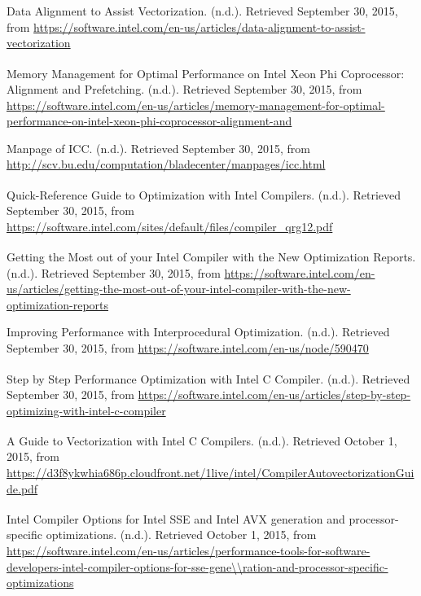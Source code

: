 \documentclass[11pt]{article}
\begin{document}
\begin{thebibliography}{9}
Data Alignment to Assist Vectorization. (n.d.). Retrieved September 30, 2015, from \url{https://software.intel.com/en-us/articles/data-alignment-to-assist-vectorization}
 
Memory Management for Optimal Performance on Intel\textsuperscript{\textregistered} Xeon Phi\textsuperscript{\texttrademark} Coprocessor: Alignment and Prefetching. (n.d.). Retrieved September 30, 2015, from \url{https://software.intel.com/en-us/articles/memory-management-for-optimal-performance-on-intel-xeon-phi-coprocessor-alignment-and}

Manpage of ICC. (n.d.). Retrieved September 30, 2015, from \url{http://scv.bu.edu/computation/bladecenter/manpages/icc.html}
 
Quick-Reference Guide to Optimization with Intel\textsuperscript{\textregistered} Compilers. (n.d.). Retrieved September 30, 2015, from \url{https://software.intel.com/sites/default/files/compiler_qrg12.pdf}

Getting the Most out of your Intel\textsuperscript{\textregistered} Compiler with the New Optimization Reports. (n.d.). Retrieved September 30, 2015, from \url{https://software.intel.com/en-us/articles/getting-the-most-out-of-your-intel-compiler-with-the-new-optimization-reports}

Improving Performance with Interprocedural Optimization. (n.d.). Retrieved September 30, 2015, from \url{https://software.intel.com/en-us/node/590470}

Step by Step Performance Optimization with Intel\textsuperscript{\textregistered} C Compiler. (n.d.). Retrieved September 30, 2015, from \url{https://software.intel.com/en-us/articles/step-by-step-optimizing-with-intel-c-compiler}

A Guide to Vectorization with Intel\textsuperscript{\textregistered} C Compilers. (n.d.). Retrieved October 1, 2015, from \url{https://d3f8ykwhia686p.cloudfront.net/1live/intel/CompilerAutovectorizationGuide.pdf}

Intel\textsuperscript{\textregistered} Compiler Options for Intel\textsuperscript{\textregistered} SSE and Intel\textsuperscript{\textregistered} AVX generation and processor-specific optimizations. (n.d.). Retrieved October 1, 2015, from \url{https://software.intel.com/en-us/articles/performance-tools-for-software-developers-intel-compiler-options-for-sse-gene\\ration-and-processor-specific-optimizations}



\end{thebibliography}

 
 
\end{document}
